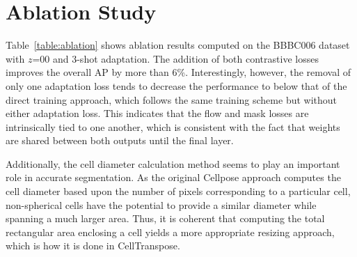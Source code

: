\section{Ablation Study} \label{ablation_results}


Table~\ref{table:ablation} shows ablation results computed on the BBBC006 dataset with $z$=00 and 3-shot adaptation. The addition of both contrastive losses improves the overall AP by more than 6\%. Interestingly, however, the removal of only one adaptation loss tends to decrease the performance to below that of the direct training approach, which follows the same training scheme but without either adaptation loss. This indicates that the flow and mask losses are intrinsically tied to one another, which is consistent with the fact that weights are shared between both outputs until the final layer.

Additionally, the cell diameter calculation method seems to play an important role in accurate segmentation. As the original Cellpose approach computes the cell diameter based upon the number of pixels corresponding to a particular cell, non-spherical cells have the potential to provide a similar diameter while spanning a much larger area. Thus, it is coherent that computing the total rectangular area enclosing a cell yields a more appropriate resizing approach, which is how it is done in CellTranspose.

